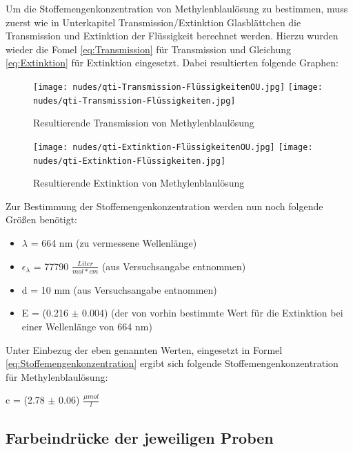 \documentclass[12pt,a4paper,twoside]{article}
\begin{document}
Um die Stoffemengenkonzentration von Methylenblaulösung zu bestimmen, muss zuerst wie in Unterkapitel Transmission/Extinktion Glasblättchen die Transmission und Extinktion der Flüssigkeit berechnet werden.
Hierzu wurden wieder die Fomel \ref{eq:Transmission} für Transmission und Gleichung \ref{eq:Extinktion} für Extinktion eingesetzt. Dabei resultierten folgende Graphen:

\begin{figure}[H]
    \centering
    \texttt{[image: nudes/qti-Transmission-FlüssigkeitenOU.jpg]}
    \texttt{[image: nudes/qti-Transmission-Flüssigkeiten.jpg]}
    \caption{Resultierende Transmission von Methylenblaulösung}
    \label{fig:TransmissionFlüssigkeiten}
\end{figure}

\begin{figure}[H]
    \centering
    \texttt{[image: nudes/qti-Extinktion-FlüssigkeitenOU.jpg]}
    \texttt{[image: nudes/qti-Extinktion-Flüssigkeiten.jpg]}
    \caption{Resultierende Extinktion von Methylenblaulösung}
    \label{fig:ExtinktionFlüssigkeiten}
\end{figure}

\noindent
Zur Bestimmung der Stoffemengenkonzentration werden nun noch folgende Größen benötigt:

\begin{itemize}
    \item $\lambda$ = 664 nm (zu vermessene Wellenlänge)
    \item $\epsilon_{\lambda}$ = 77790 $\frac{Liter}{mol*cm}$ (aus Versuchsangabe entnommen)
    \item d = 10 mm (aus Versuchsangabe entnommen)
    \item E = (0.216 $\pm$ 0.004) (der von vorhin bestimmte Wert für die Extinktion bei einer Wellenlänge von 664 nm)
\end{itemize}

\noindent
Unter Einbezug der eben genannten Werten, eingesetzt in Formel \ref{eq:Stoffemengenkonzentration} ergibt sich folgende Stoffemengenkonzentration für Methylenblaulösung: \newline

\noindent
c = (2.78 $\pm$ 0.06) $\frac{\mu mol}{l}$





\subsection{Farbeindrücke der jeweiligen Proben}
\end{document}
